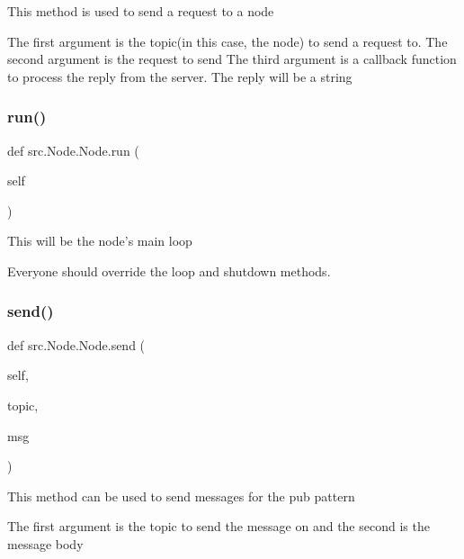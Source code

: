 \begin{DoxyVerb}This method is used to send a request to a node

The first argument is the topic(in this case, the node) to send a request to.
The second argument is the request to send
The third argument is a callback function to process the reply from the server. The reply will be a string
\end{DoxyVerb}
 \mbox{\label{classsrc_1_1_node_1_1_node_a362a8826afeeb04d85aed9e0c9f82e22}} 
\subsubsection{\texorpdfstring{run()}{run()}}
{\footnotesize\ttfamily def src.\+Node.\+Node.\+run (\begin{DoxyParamCaption}\item[{}]{self }\end{DoxyParamCaption})}

\begin{DoxyVerb}This will be the node's main loop

Everyone should override the loop and shutdown methods.
\end{DoxyVerb}
 \mbox{\label{classsrc_1_1_node_1_1_node_a901953eab0e8459816753b0dab20853f}} 
\subsubsection{\texorpdfstring{send()}{send()}}
{\footnotesize\ttfamily def src.\+Node.\+Node.\+send (\begin{DoxyParamCaption}\item[{}]{self,  }\item[{}]{topic,  }\item[{}]{msg }\end{DoxyParamCaption})}

\begin{DoxyVerb}This method can be used to send messages for the pub pattern

The first argument is the topic to send the message on and the second is the message body
\end{DoxyVerb}
 \mbox{\label{classsrc_1_1_node_1_1_node_a0dd2a9b337a3c3d8ae91178043f60230}} 
